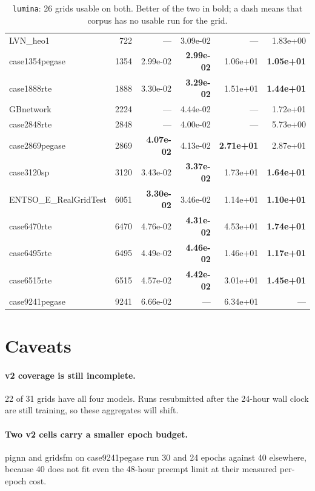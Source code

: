 \documentclass[10pt]{article}
\begin{document}
\begin{table}[H]
\begin{tabular}{lr rr rr}
LVN\_heo1 & 722 & --- & 3.09e-02 & --- & 1.83e+00 \\
case1354pegase & 1354 & 2.99e-02 & \textbf{2.99e-02} & 1.06e+01 & \textbf{1.05e+01} \\
case1888rte & 1888 & 3.30e-02 & \textbf{3.29e-02} & 1.51e+01 & \textbf{1.44e+01} \\
GBnetwork & 2224 & --- & 4.44e-02 & --- & 1.72e+01 \\
case2848rte & 2848 & --- & 4.00e-02 & --- & 5.73e+00 \\
case2869pegase & 2869 & \textbf{4.07e-02} & 4.13e-02 & \textbf{2.71e+01} & 2.87e+01 \\
case3120sp & 3120 & 3.43e-02 & \textbf{3.37e-02} & 1.73e+01 & \textbf{1.64e+01} \\
ENTSO\_E\_RealGridTest & 6051 & \textbf{3.30e-02} & 3.46e-02 & 1.14e+01 & \textbf{1.10e+01} \\
case6470rte & 6470 & 4.76e-02 & \textbf{4.31e-02} & 4.53e+01 & \textbf{1.74e+01} \\
case6495rte & 6495 & 4.49e-02 & \textbf{4.46e-02} & 1.46e+01 & \textbf{1.17e+01} \\
case6515rte & 6515 & 4.57e-02 & \textbf{4.42e-02} & 3.01e+01 & \textbf{1.45e+01} \\
case9241pegase & 9241 & 6.66e-02 & --- & 6.34e+01 & --- \\
\bottomrule
\end{tabular}
\caption{\texttt{lumina}: 26 grids usable on both. Better of the two in bold; a dash means that corpus
has no usable run for the grid.}
\end{table}

\section{Caveats}

\paragraph{v2 coverage is still incomplete.} 22 of 31 grids have all four
models. Runs resubmitted after the 24-hour wall clock are still training, so
these aggregates will shift.

\paragraph{Two v2 cells carry a smaller epoch budget.} pignn and gridsfm on
case9241pegase run 30 and 24 epochs against 40 elsewhere, because 40 does not
fit even the 48-hour preempt limit at their measured per-epoch cost.
\end{document}
